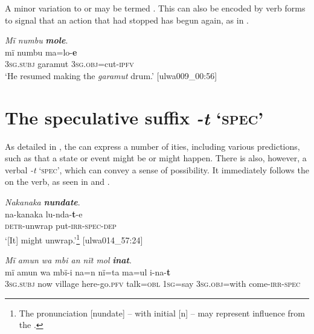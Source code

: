 A minor variation to  or   may be termed  . This  can also be encoded by  verb forms to signal that an action that had stopped has begun again, as in .


\ea%
    \label{ex:verbs:70}
         \textit{Mï numbu} \textbf{\textit{mole}}.\\
\gll mï       numbu   ma=lo-\textbf{e}\\
    3\textsc{sg.subj}  garamut  3\textsc{sg.obj}=cut-\textsc{ipfv}\\
\glt `He resumed making the \textit{garamut} drum.’ [ulwa009\_00:56]
\z

\section{The speculative suffix \textit{-t} ‘\textsc{spec}’}\label{sec:4.11}


As detailed in , the   can express a number of ities, including various predictions, such as that a state or event might be or might happen. There is also, however, a verbal  \textit{-t} ‘\textsc{spec’}, which can convey a sense of  possibility. It immediately follows the   on the verb, as seen in  and .

\ea%
    \label{ex:verbs:71}
          \textit{Nakanaka} \textbf{\textit{nundate}}.\\
\gll na-kanaka    lu{}-nda-\textbf{t}{}-e\\
    \textsc{detr-}unwrap  put-\textsc{irr-spec-dep}\\
\glt `[It] might unwrap.’\footnote{The pronunciation [nundate] – with initial [n] – may represent influence from the  .} [ulwa014\_57:24]
\z

\ea%
    \label{ex:verbs:72}
          \textit{Mï amun wa mbi an nït mol} \textbf{\textit{inat}}.\\
\gll mï      amun  wa    mbï-i      na=n    nï=ta ma=ul      i-na-\textbf{t}\\
    3\textsc{sg.subj}  now   village  here-go.\textsc{pfv}  talk\textsc{=obl}  \textsc{1sg=}say    3\textsc{sg.obj}=with  come-\textsc{irr-spec}\\


